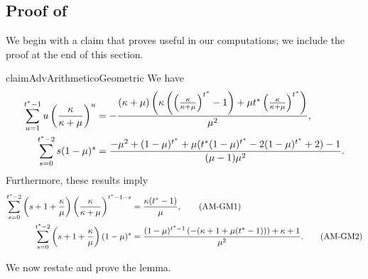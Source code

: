 \subsection{Proof of }
\label{proof: AdvTheoremProofSum}
We begin with a claim that proves useful in our computations; we include the proof at the end of this section.
\begin{restatable}{claim}{AdvArithmeticoGeometric}
 \label{claim: AdvArithmeticoGeometric}
    We have
        \begin{align*}
            \sum_{u=1}^{t^*-1} u \left(\frac{\kappa}{\kappa+\mu}\right)^{u} &= -\frac{(\kappa + \mu) \left( \kappa \left(  \left( \frac{\kappa}{\kappa + \mu} \right)^{t^*} -1 \right) + \mu t^* \left( \frac{\kappa}{\kappa + \mu} \right)^{t^*} \right)}{\mu^2},\\
            \sum_{s=0}^{t^*-2} s (1-\mu)^s &= \frac{-\mu^2 + (1-\mu)^{t^*} + \mu(t^*(1-\mu)^{t^*} - 2(1-\mu)^{t^*} + 2) - 1}{(\mu - 1)\mu^2}.
        \end{align*}
        Furthermore, these results imply
        \begin{align*}
            \sum_{s=0}^{t^*-2} \left(s+1+\frac{\kappa}{\mu} \right) \left(\frac{\kappa}{\kappa+\mu}\right)^{t^* - 1 - s} &= \frac{\kappa(t^*-1)}{\mu}, \tag{AM-GM1} \label{eq-proof: AMGM1}\\
            \sum_{s=0}^{t^*-2} \left(s+1+\frac{\kappa}{\mu} \right) (1-\mu)^s &= \frac{(1 - \mu)^{t^* - 1} \left( -(\kappa + 1 + \mu (t^* - 1)) \right) + \kappa + 1}{\mu^2}. \tag{AM-GM2} \label{eq-proof: AMGM2}
        \end{align*}
\end{restatable}

We now restate and prove the lemma. 

\AdvTheoremProofSum*

